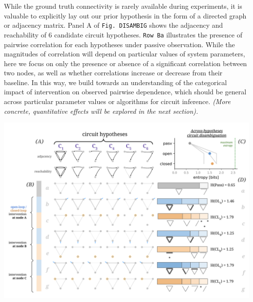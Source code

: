 \documentclass{article}
\begin{document}
While the ground truth connectivity is rarely available during experiments, it is valuable to explicitly lay out our prior hypothesis in the form of a directed graph or adjacency matrix. Panel A of
\texttt{Fig.\ DISAMBIG} shows the adjacency and reachability of 6 candidate circuit hypotheses. \texttt{Row\ Ba} illustrates the presence of pairwise correlation for each hypotheses under passive observation. While the magnitudes of correlation will depend on particular values of system parameters, here we focus on only the presence or absence of a significant correlation between two nodes, as well as whether correlations increase or decrease from their baseline. In this way, we build towards an understanding of the categorical impact of intervention on observed pairwise dependence, which should be general across particular parameter values or algorithms for circuit inference.
\emph{(More concrete, quantitative effects will be explored in the next section).}

\includegraphics[width=1.0\textwidth]{figures/core_figure_sketches/circuit_entropy_sketch.png}
\end{document}
